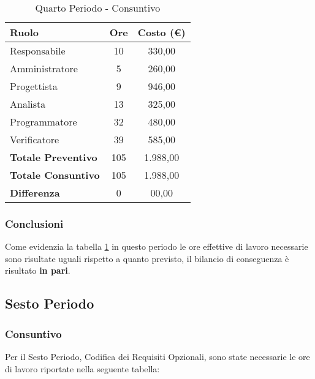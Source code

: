 \documentclass[../PianoDiProgetto_v4.0.0.tex]{subfiles}
\begin{document}
		\begin{table}[h]
				\centering
				\begin{tabular}{l * {2}{c}}
					\toprule
					\textbf{Ruolo} & \textbf{Ore} & \textbf{Costo (\euro{})} \\
					\midrule
					Responsabile & 10 & 330,00 \\

					Amministratore & 5 & 260,00 \\

					Progettista & 9 & 946,00 \\

					Analista & 13 & 325,00 \\		

					Programmatore & 32 & 480,00 \\		

					Verificatore & 39 & 585,00 \\				
					\midrule		
					\textbf{Totale Preventivo} & 105 & 1.988,00 \\
					\textbf{Totale Consuntivo} & 105  & 1.988,00 \\
					\midrule
					\textbf{Differenza} & 0  & 00,00 \\
					\bottomrule
				\end{tabular}
				\caption{Quarto Periodo - Consuntivo}
				\label{tab:consuntivo5}	
			\end{table}
		
		\subsubsection{Conclusioni}
		Come evidenzia la tabella \ref{tab:consuntivo5} in questo periodo le ore effettive di lavoro necessarie sono risultate uguali rispetto a quanto previsto, il  bilancio di conseguenza è risultato \textbf{in pari}.
		
		\newpage
		\subsection{Sesto Periodo}
		\subsubsection{Consuntivo}
		Per il Sesto Periodo, Codifica dei Requisiti Opzionali, sono state necessarie le ore di lavoro riportate nella seguente tabella:
		
\end{document}
